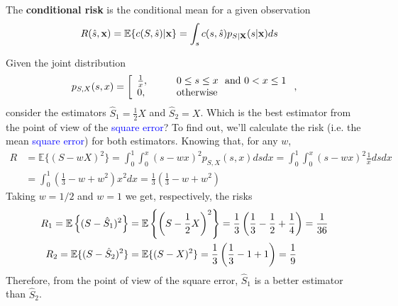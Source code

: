 The {\bf conditional risk} is the conditional mean for a given observation
\begin{align}
\label{Est:cond_risk}
R(\hat s, {\bf x}) = \mathbb{E}\{c(S, \hat s) |{\bf x}\} 
           & = \int_s c(s,\hat s) p_{S|{\bf X}}(s|{\bf x}) ds
\end{align}

\begin{example}
\label{CalculoECM}
Given the joint distribution
\begin{equation}
p_{S,X}(s,x) = \left[
\begin{array}{ll}
\frac{1}{x}, & \qquad 0 \le s \le x ~~{\rm and}~ 0 < x \le 1 \\
0,           & \qquad \text{otherwise}
\end{array}
\right.,
\end{equation}
consider the estimators $\hat{S}_1 = \frac{1}{2}X$ and $\hat{S}_2 = X$. Which is the best estimator from the point of view of the \textcolor{blue}{square error}? To find out, we'll calculate the risk (i.e. the mean \textcolor{blue}{square error}) for both estimators.
Knowing that, for any $w$,
\begin{align}
R &=\mathbb{E}\{(S-wX)^2\}   
   = \int_0^1 \int_0^x (s-wx)^2 p_{S,X}(s,x) ds dx   
   = \int_0^1 \int_0^x (s-wx)^2 \frac{1}{x}ds dx   \nonumber\\
  &= \int_0^1 \left(\frac{1}{3} - w  + w^2 \right) x^2 dx  
   = \frac{1}{3}\left(\frac{1}{3} - w  + w^2 \right) 
\end{align}
Taking $w=1/2$ and $w=1$ we get, respectively, the risks
\begin{align}
R_1  = \mathbb{E}\left\{(S-\hat{S}_1)^2\right\} 
	&= \mathbb{E}\left\{\left(S-\frac12 X\right)^2\right\}   
     = \frac{1}{3}\left(\frac{1}{3} - \frac{1}{2}  + \frac{1}{4} \right)
     = \frac{1}{36} \\
R_2  = \mathbb{E}\{(S-\hat{S}_2)^2\} & = \mathbb{E}\{(S-X)^2\}   
 = \frac{1}{3}\left(\frac{1}{3} - 1  + 1 \right) = \frac{1}{9}
\end{align}
Therefore, from the point of view of the square error, $\hat{S}_1$ is a better estimator than $\hat{S}_2$.
\end{example}

